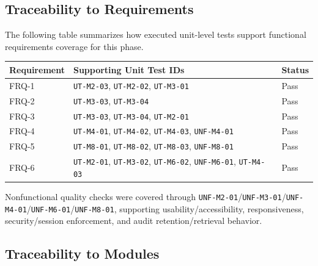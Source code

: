 \documentclass[12pt, titlepage]{article}
\begin{document}
\subsection{Traceability to Requirements}

The following table summarizes how executed unit-level tests support functional
requirements coverage for this phase.

\renewcommand{\arraystretch}{1.2}
\begin{tabularx}{\textwidth}{>{\raggedright\arraybackslash}p{1.7cm} X >{\raggedright\arraybackslash}p{1.5cm}}
\toprule
\textbf{Requirement} & \textbf{Supporting Unit Test IDs} & \textbf{Status}\\
\midrule
FRQ-1 & \texttt{UT-M2-03}, \texttt{UT-M2-02}, \texttt{UT-M3-01} & Pass\\
FRQ-2 & \texttt{UT-M3-03}, \texttt{UT-M3-04} & Pass\\
FRQ-3 & \texttt{UT-M3-03}, \texttt{UT-M3-04}, \texttt{UT-M2-01} & Pass\\
FRQ-4 & \texttt{UT-M4-01}, \texttt{UT-M4-02}, \texttt{UT-M4-03}, \texttt{UNF-M4-01} & Pass\\
FRQ-5 & \texttt{UT-M8-01}, \texttt{UT-M8-02}, \texttt{UT-M8-03}, \texttt{UNF-M8-01} & Pass\\
FRQ-6 & \texttt{UT-M2-01}, \texttt{UT-M3-02}, \texttt{UT-M6-02}, \texttt{UNF-M6-01}, \texttt{UT-M4-03} & Pass\\
\bottomrule
\end{tabularx}

Nonfunctional quality checks were covered through
\texttt{UNF-M2-01}/\texttt{UNF-M3-01}/\texttt{UNF-M4-01}/\texttt{UNF-M6-01}/\texttt{UNF-M8-01},
supporting usability/accessibility, responsiveness, security/session
enforcement, and audit retention/retrieval behavior.
		
\subsection{Traceability to Modules}
\end{document}
